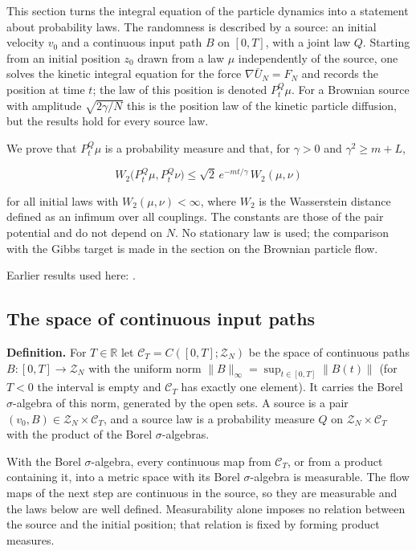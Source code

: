 \documentclass[11pt,a4paper]{report}
\begin{document}
This section turns the integral equation of the particle dynamics into a statement about probability laws. The randomness is described by a source: an initial velocity \(v_0\) and a continuous input path \(B\) on \([0,T]\), with a joint law \(Q\). Starting from an initial position \(z_0\) drawn from a law \(\mu\) independently of the source, one solves the kinetic integral equation for the force \(\nabla\bar U_N=F_N\) and records the position at time \(t\); the law of this position is denoted \(P^Q_t\mu\). For a Brownian source with amplitude \(\sqrt{2\gamma/N}\) this is the position law of the kinetic particle diffusion, but the results hold for every source law.




We prove that \(P^Q_t\mu\) is a probability measure and that, for \(\gamma>0\) and \(\gamma^2\ge m+L\),


\[W_2\bigl(P^Q_t\mu,P^Q_t\nu\bigr)\le\sqrt2\,e^{-mt/\gamma}\,W_2(\mu,\nu)\]


for all initial laws with \(W_2(\mu,\nu)<\infty\), where \(W_2\) is the Wasserstein distance defined as an infimum over all couplings. The constants are those of the pair potential and do not depend on \(N\). No stationary law is used; the comparison with the Gibbs target is made in the section on the Brownian particle flow.



Earlier results used here: \cite[Section~3.9]{LangevinLean2026Kinetic}.
\subsection{\texorpdfstring{The space of continuous input paths}{The space of continuous input paths}}
\label{report-step-KIPLMC-FlowLaw-lean-1}


\textbf{Definition.} For \(T\in\mathbb R\) let \(\mathcal C_T=C([0,T];\mathcal Z_N)\) be the space of continuous paths \(B:[0,T]\to\mathcal Z_N\) with the uniform norm \(\|B\|_\infty=\sup_{t\in[0,T]}\|B(t)\|\) (for \(T<0\) the interval is empty and \(\mathcal C_T\) has exactly one element). It carries the Borel \(\sigma\)-algebra of this norm, generated by the open sets. A source is a pair \((v_0,B)\in\mathcal Z_N\times\mathcal C_T\), and a source law is a probability measure \(Q\) on \(\mathcal Z_N\times\mathcal C_T\) with the product of the Borel \(\sigma\)-algebras.




With the Borel \(\sigma\)-algebra, every continuous map from \(\mathcal C_T\), or from a product containing it, into a metric space with its Borel \(\sigma\)-algebra is measurable. The flow maps of the next step are continuous in the source, so they are measurable and the laws below are well defined. Measurability alone imposes no relation between the source and the initial position; that relation is fixed by forming product measures.
\end{document}
